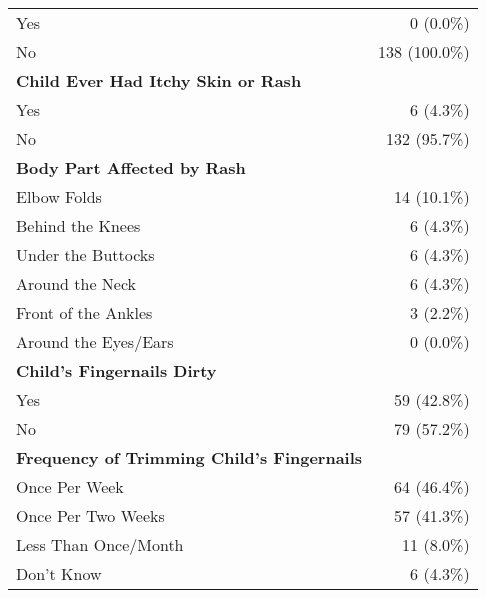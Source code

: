 \documentclass[4pt,letterpaper]{article}
\begin{document}
\begin{multicols}{2}
\begin{center}
\begin{tabular}{p{5cm}r}
Yes & 0 (0.0\%) \\
No & 138 (100.0\%) \\
\midrule
\textbf{Child Ever Had Itchy Skin or Rash} & \\
Yes & 6 (4.3\%) \\
No & 132 (95.7\%) \\
\midrule
\textbf{Body Part Affected by Rash} & \\
Elbow Folds & 14 (10.1\%) \\
Behind the Knees & 6 (4.3\%) \\
Under the Buttocks & 6 (4.3\%) \\
Around the Neck & 6 (4.3\%) \\
Front of the Ankles & 3 (2.2\%) \\
Around the Eyes/Ears & 0 (0.0\%) \\
\midrule
\textbf{Child's Fingernails Dirty} & \\
Yes & 59 (42.8\%) \\
No & 79 (57.2\%) \\
\midrule
\textbf{Frequency of Trimming Child's Fingernails} & \\
Once Per Week & 64 (46.4\%) \\
Once Per Two Weeks & 57 (41.3\%) \\
Less Than Once/Month & 11 (8.0\%) \\
Don't Know & 6 (4.3\%) \\
\bottomrule
\end{tabular}
\end{center}


\end{multicols}
\end{document}
